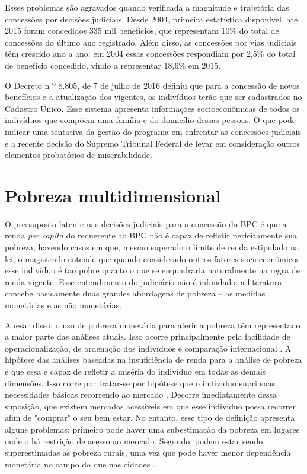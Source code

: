 \documentclass[
	12pt,				%
	openright,			%
	twoside,			%
	a4paper,			%
	english,			%
	french,				%
	spanish,			%
	brazil				%
	]{abntex2}
\begin{document}
Esses problemas são agravados quando verificada a magnitude e trajetória das concessões por decisões judiciais. Desde 2004, primeira estatística disponível, até 2015 foram concedidos 335 mil benefícios, que representam 10\% do total de concessões do último ano registrado. Além disso, as concessões por vias judiciais têm crescido ano a ano: em 2004 essas concessões respondiam por 2,5\% do total de benefício concedido, vindo a representar 18,6\% em 2015.

O Decreto n º 8.805, de 7 de julho de 2016 definiu que para a concessão de novos benefícios e a atualização dos vigentes, os indivíduos terão que ser cadastrados no Cadastro Único. Esse sistema apresenta informações socioeconômicas de todos os indivíduos que compõem uma família e do domicílio dessas pessoas. O que pode indicar uma tentativa da gestão do programa em enfrentar as concessões judiciais e a recente decisão do Supremo Tribunal Federal de levar em consideração outros elementos probatórios de miserabilidade. 

\chapter{Pobreza multidimensional}

O pressuposto latente nas decisões judiciais para a concessão do BPC é que a renda \textit{per capita} do requerente ao BPC não é capaz de refletir perfeitamente sua pobreza, havendo casos em que, mesmo superado o limite de renda estipulado na lei, o magistrado entende que quando considerado outros fatores socioeconômicos esse indivíduo é tao pobre quanto o que se enquadraria naturalmente na regra de renda vigente. Esse entendimento do judiciário não é infundado: a literatura concebe basicamente duas grandes abordagens de pobreza -- as medidas monetárias e as não monetárias. 

Apesar disso, o uso de pobreza monetária para aferir a pobreza têm representado a maior parte das análises atuais. Isso ocorre principalmente pela facilidade de operacionalização, de ordenação dos indivíduos e comparação internacional \cite{lopes2003indicador}. A hipótese das análises baseadas na insuficiência de renda para a análise de pobreza é que essa é capaz de refletir a miséria do indivíduo em todas as demais dimensões. Isso corre por tratar-se por hipótese que o indivíduo supri suas necessidades básicas recorrendo ao mercado \cite{rocha2003pobreza}. Decorre imediatamente dessa suposição, que existem mercados acessíveis em que esse indivíduo possa recorrer afim de "comprar" o seu bem estar. No entanto, esse tipo de definição apresenta alguns problemas: primeiro pode haver uma subestimação da pobreza em lugares onde o há restrição de acesso ao mercado. Segundo, podem estar sendo superestimadas as pobreza rurais, uma vez que pode haver menor dependência monetária no campo do que nas cidades \cite{lopes2003indicador}.
\end{document}
